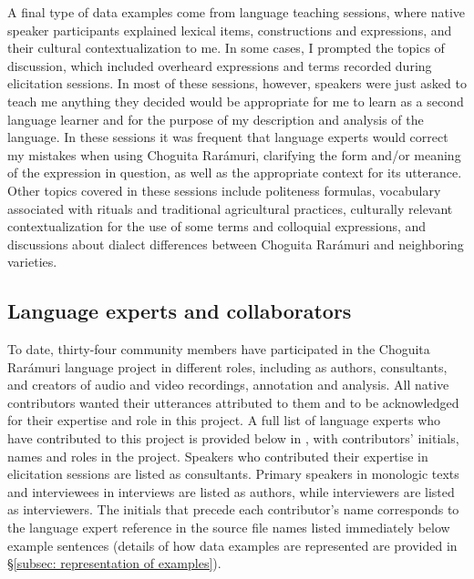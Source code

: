 A final type of data examples come from language teaching sessions, where native speaker participants explained lexical items, constructions and expressions, and their cultural contextualization to me. In some cases, I prompted the topics of discussion, which included overheard expressions and terms recorded during elicitation sessions. In most of these sessions, however, speakers were just asked to teach me anything they decided would be appropriate for me to learn as a second language learner and for the purpose of my description and analysis of the language. In these sessions it was frequent that language experts would correct my mistakes when using Choguita Rarámuri, clarifying the form and/or meaning of the expression in question, as well as the appropriate context for its utterance. Other topics covered in these sessions include politeness formulas, vocabulary associated with rituals and traditional agricultural practices, culturally relevant contextualization for the use of some terms and colloquial expressions, and discussions about dialect differences between Choguita Rarámuri and neighboring varieties.

\subsection{Language experts and collaborators}
\label{subsec: language experts and collaborators}

To date, thirty-four community members have participated in the Choguita Rarámuri language project in different roles, including as authors, consultants, and creators of audio and video recordings, annotation and analysis. All native
contributors wanted their utterances attributed to them and to be acknowledged for their expertise and role in this project. A full list of language experts who have contributed to this project is provided below in , with contributors' initials, names and roles in the project. Speakers who contributed their expertise in elicitation sessions are listed as consultants. Primary speakers in monologic texts and interviewees in interviews are listed as authors, while interviewers are listed as interviewers. The initials that precede each contributor's name corresponds to the language expert reference in the source file names listed immediately below example sentences (details of how data examples are represented are provided in §\ref{subsec: representation of examples}).


